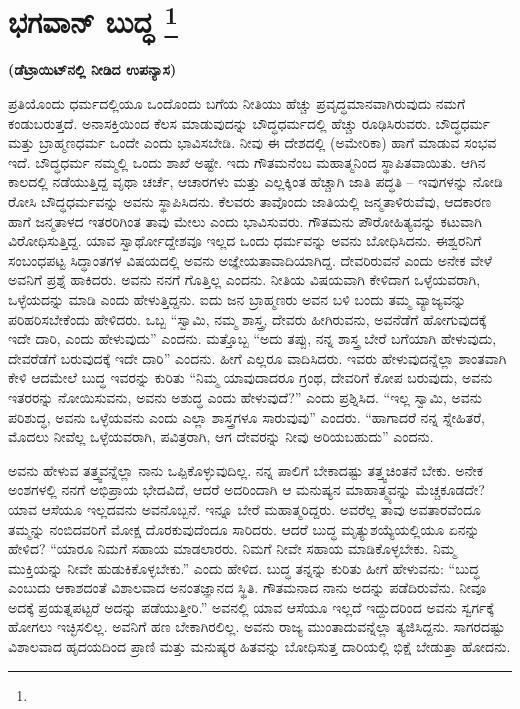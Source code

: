 
\chapter[ಭಗವಾನ್ ಬುದ್ಧ ]{ಭಗವಾನ್ ಬುದ್ಧ \protect\footnote{}}

\centerline{\textbf{(ಡೆಟ್ರಾಯಿಟ್​ನಲ್ಲಿ ನೀಡಿದ ಉಪನ್ಯಾಸ)}}

ಪ್ರತಿಯೊಂದು ಧರ್ಮದಲ್ಲಿಯೂ ಒಂದೊಂದು ಬಗೆಯ ನೀತಿಯು ಹೆಚ್ಚು ಪ್ರವೃದ್ಧಮಾನವಾಗಿರುವುದು ನಮಗೆ ಕಂಡುಬರುತ್ತದೆ. ಅನಾಸಕ್ತಿಯಿಂದ ಕೆಲಸ ಮಾಡುವುದನ್ನು ಬೌದ್ಧಧರ್ಮದಲ್ಲಿ ಹೆಚ್ಚು ರೂಢಿಸಿರುವರು. ಬೌದ್ಧಧರ್ಮ ಮತ್ತು ಬ್ರಾಹ್ಮಣಧರ್ಮ ಒಂದೇ ಎಂದು ಭಾವಿಸಬೇಡಿ. ನೀವು ಈ ದೇಶದಲ್ಲಿ (ಅಮೇರಿಕಾ) ಹಾಗೆ ಮಾಡುವ ಸಂಭವ ಇದೆ. ಬೌದ್ಧಧರ್ಮ ನಮ್ಮಲ್ಲಿ ಒಂದು ಶಾಖೆ ಅಷ್ಟೇ. ಇದು ಗೌತಮನೆಂಬ ಮಹಾತ್ಮನಿಂದ ಸ್ಥಾಪಿತವಾಯಿತು. ಆಗಿನ ಕಾಲದಲ್ಲಿ ನಡೆಯುತ್ತಿದ್ದ ವೃಥಾ ಚರ್ಚೆ, ಆಚಾರಗಳು ಮತ್ತು ಎಲ್ಲಕ್ಕಿಂತ ಹೆಚ್ಚಾಗಿ ಜಾತಿ ಪದ್ಧತಿ – ಇವುಗಳನ್ನು ನೋಡಿ ರೋಸಿ ಬೌದ್ಧಧರ್ಮವನ್ನು ಅವನು ಸ್ಥಾಪಿಸಿದನು. ಕೆಲವರು ತಾವೊಂದು ಜಾತಿಯಲ್ಲಿ ಜನ್ಮತಾಳಿರುವೆವು, ಆದಕಾರಣ ಹಾಗೆ ಜನ್ಮತಾಳದ ಇತರರಿಗಿಂತ ತಾವು ಮೇಲು ಎಂದು ಭಾವಿಸುವರು. ಗೌತಮನು ಪೌರೋಹಿತ್ಯವನ್ನು ಕಟುವಾಗಿ ವಿರೋಧಿಸುತ್ತಿದ್ದ. ಯಾವ ಸ್ವಾರ್ಥೋದ್ದೇಶವೂ ಇಲ್ಲದ ಒಂದು ಧರ್ಮವನ್ನು ಅವನು ಬೋಧಿಸಿದನು. ಈಶ್ವರನಿಗೆ ಸಂಬಂಧಪಟ್ಟ ಸಿದ್ಧಾಂತಗಳ ವಿಷಯದಲ್ಲಿ ಅವನು ಅಜ್ಞೇಯತಾವಾದಿಯಾಗಿದ್ದ. ದೇವರಿರುವನೆ ಎಂದು ಅನೇಕ ವೇಳೆ ಅವನಿಗೆ ಪ್ರಶ್ನೆ ಹಾಕಿದರು. ಅವನು ನನಗೆ ಗೊತ್ತಿಲ್ಲ ಎಂದನು. ನೀತಿಯ ವಿಷಯವಾಗಿ ಕೇಳಿದಾಗ ಒಳ್ಳೆಯವರಾಗಿ, ಒಳ್ಳೆಯದನ್ನು ಮಾಡಿ ಎಂದು ಹೇಳುತ್ತಿದ್ದನು. ಐದು ಜನ ಬ್ರಾಹ್ಮಣರು ಅವನ ಬಳಿ ಬಂದು ತಮ್ಮ ವ್ಯಾಜ್ಯವನ್ನು ಪರಿಹರಿಸಬೇಕೆಂದು ಹೇಳಿದರು. ಒಬ್ಬ “ಸ್ವಾಮಿ, ನಮ್ಮ ಶಾಸ್ತ್ರ, ದೇವರು ಹೀಗಿರುವನು, ಅವನೆಡೆಗೆ ಹೋಗುವುದಕ್ಕೆ ಇದೇ ದಾರಿ, ಎಂದು ಹೇಳುವುದು” ಎಂದನು. ಮತ್ತೊಬ್ಬ “ಅದು ತಪ್ಪು, ನನ್ನ ಶಾಸ್ತ್ರ ಬೇರೆ ಬಗೆಯಾಗಿ ಹೇಳುವುದು, ದೇವರೆಡೆಗೆ ಬರುವುದಕ್ಕೆ ಇದೇ ದಾರಿ” ಎಂದನು. ಹೀಗೆ ಎಲ್ಲರೂ ವಾದಿಸಿದರು. ಇವರು ಹೇಳುವುದನ್ನೆಲ್ಲಾ ಶಾಂತವಾಗಿ ಕೇಳಿ ಆದಮೇಲೆ ಬುದ್ಧ ಇವರನ್ನು ಕುರಿತು “ನಿಮ್ಮ ಯಾವುದಾದರೂ ಗ್ರಂಥ, ದೇವರಿಗೆ ಕೋಪ ಬರುವುದು, ಅವನು ಇತರರನ್ನು ನೋಯಿಸುವನು, ಅವನು ಅಶುದ್ಧ ಎಂದು ಹೇಳುವುದೆ?” ಎಂದು ಪ್ರಶ್ನಿಸಿದ. “ಇಲ್ಲ ಸ್ವಾಮಿ, ಅವನು ಪರಿಶುದ್ಧ, ಅವನು ಒಳ್ಳೆಯವನು ಎಂದು ಎಲ್ಲಾ ಶಾಸ್ತ್ರಗಳೂ ಸಾರುವುವು” ಎಂದರು. “ಹಾಗಾದರೆ ನನ್ನ ಸ್ನೇಹಿತರೆ, ಮೊದಲು ನೀವೆಲ್ಲ ಒಳ್ಳೆಯವರಾಗಿ, ಪವಿತ್ರರಾಗಿ, ಆಗ ದೇವರನ್ನು ನೀವು ಅರಿಯಬಹುದು” ಎಂದನು.

ಅವನು ಹೇಳುವ ತತ್ತ್ವವನ್ನೆಲ್ಲಾ ನಾನು ಒಪ್ಪಿಕೊಳ್ಳುವುದಿಲ್ಲ. ನನ್ನ ಪಾಲಿಗೆ ಬೇಕಾದಷ್ಟು ತತ್ತ್ವಚಿಂತನೆ ಬೇಕು. ಅನೇಕ ಅಂಶಗಳಲ್ಲಿ ನನಗೆ ಅಭಿಪ್ರಾಯ ಭೇದವಿದೆ, ಆದರೆ ಅದರಿಂದಾಗಿ ಆ ಮನುಷ್ಯನ ಮಾಹಾತ್ಮ್ಯವನ್ನು ಮೆಚ್ಚಕೂಡದೇ? ಯಾವ ಆಸೆಯೂ ಇಲ್ಲದವನು ಅವನೊಬ್ಬನೆ. ಇನ್ನೂ ಬೇರೆ ಮಹಾತ್ಮರಿದ್ದರು. ಅವರೆಲ್ಲ ತಾವು ಅವತಾರವೆಂದೂ ತಮ್ಮನ್ನು ನಂಬಿದವರಿಗೆ ಮೋಕ್ಷ ದೊರಕುವುದೆಂದೂ ಸಾರಿದರು. ಆದರೆ ಬುದ್ಧ ಮೃತ್ಯುಶಯ್ಯೆಯಲ್ಲಿಯೂ ಏನನ್ನು ಹೇಳಿದ? “ಯಾರೂ ನಿಮಗೆ ಸಹಾಯ ಮಾಡಲಾರರು. ನಿಮಗೆ ನೀವೇ ಸಹಾಯ ಮಾಡಿಕೊಳ್ಳಬೇಕು. ನಿಮ್ಮ ಮುಕ್ತಿಯನ್ನು ನೀವೇ ಹುಡುಕಿಕೊಳ್ಳಬೇಕು.” ಎಂದು ಹೇಳಿದ. ಬುದ್ಧ ತನ್ನನ್ನು ಕುರಿತು ಹೀಗೆ ಹೇಳುವನು: “ಬುದ್ಧ ಎಂಬುದು ಆಕಾಶದಂತೆ ವಿಶಾಲವಾದ ಅನಂತಜ್ಞಾನದ ಸ್ಥಿತಿ. ಗೌತಮನಾದ ನಾನು ಅದನ್ನು ಪಡೆದಿರುವೆನು. ನೀವೂ ಅದಕ್ಕೆ ಪ್ರಯತ್ನಪಟ್ಟರೆ ಅದನ್ನು ಪಡೆಯುತ್ತೀರಿ.” ಅವನಲ್ಲಿ ಯಾವ ಆಸೆಯೂ ಇಲ್ಲದೆ ಇದ್ದುದರಿಂದ ಅವನು ಸ್ವರ್ಗಕ್ಕೆ ಹೋಗಲು ಇಚ್ಛಿಸಲಿಲ್ಲ. ಅವನಿಗೆ ಹಣ ಬೇಕಾಗಿರಲಿಲ್ಲ. ಅವನು ರಾಜ್ಯ ಮುಂತಾದುವನ್ನೆಲ್ಲಾ ತ್ಯಜಿಸಿದ್ದನು. ಸಾಗರದಷ್ಟು ವಿಶಾಲವಾದ ಹೃದಯದಿಂದ ಪ್ರಾಣಿ ಮತ್ತು ಮನುಷ್ಯರ ಹಿತವನ್ನು ಬೋಧಿಸುತ್ತ ದಾರಿಯಲ್ಲಿ ಭಿಕ್ಷೆ ಬೇಡುತ್ತಾ ಹೋದನು.


